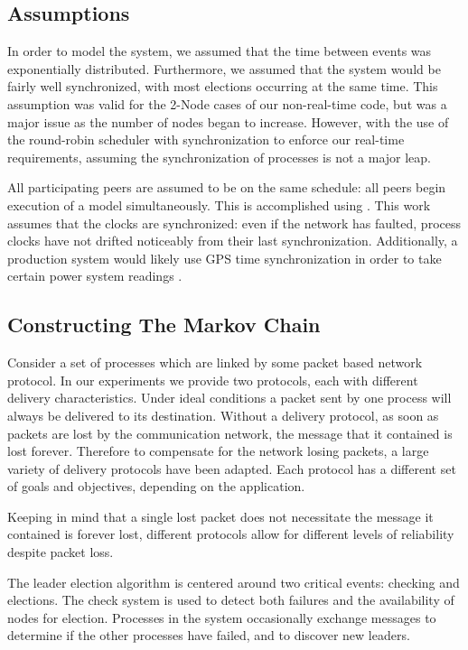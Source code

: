 \subsection{Assumptions}
In order to model the system, we assumed that the time between events was 
exponentially distributed. Furthermore, we assumed that the system would be
fairly well synchronized, with most elections occurring at the same time. This
assumption was valid for the 2-Node cases of our non-real-time code, but was
a major issue as the number of nodes began to increase. However, with
the use of the round-robin scheduler with synchronization to enforce our
real-time requirements, assuming the synchronization of processes is not a
major leap.

All participating peers are assumed to be on the same schedule: all
peers begin execution of a model simultaneously. This is accomplished using \cite{DCS}.
This work assumes that the clocks are synchronized: even if the network has faulted,
process clocks have not drifted noticeably from their last synchronization. Additionally,
a production system would likely use GPS time synchronization in order to take
certain power system readings \cite{PHASORREADINGS}.

\subsection{Constructing The Markov Chain}

Consider a set of processes which are linked by some packet based network
protocol. In our experiments we provide two protocols, each with different
delivery characteristics. Under ideal conditions a packet sent by one process
will always be delivered to its destination. Without a delivery protocol, as
soon as packets are lost by the communication network, the message that it
contained is lost forever. Therefore to compensate for the network losing
packets, a large variety of delivery protocols have been adapted. Each protocol
has a different set of goals and objectives, depending on the application.

Keeping in mind that a single lost packet does not necessitate the message it
contained is forever lost, different protocols allow for different levels of
reliability despite packet loss.

The leader election algorithm is centered around two critical events: checking
and elections. The check system is used to detect both failures and the
availability of nodes for election. Processes in the system occasionally exchange 
messages to determine if the other processes have failed, and to discover new
leaders. 

